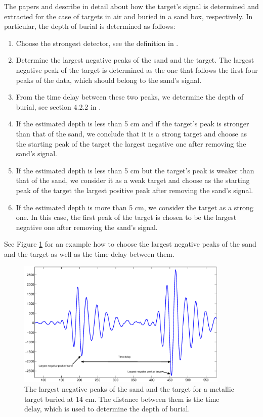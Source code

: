 \documentclass[a4paper,12pt]{article}
\begin{document}
The papers \cite{TBKF:SISC2014} and \cite{TBKF:2013-2} describe in detail about how the target's signal is determined and extracted for the case of targets in air and buried in a sand box, respectively. In particular, the depth of burial is determined as follows:


\begin{enumerate}
   \item Choose the strongest detector, see the definition in \cite{TBKF:2013-2}. 
    \item Determine the largest negative peaks of the sand and the target. The largest negative peak of the target is determined as the one that follows the first four peaks of the data, which should belong to the sand's signal. 
    \item From the time delay between these two peaks, we determine the depth of burial, see section 4.2.2 in \cite{TBKF:2013-2}. 
    \item If the estimated depth is less than 5 cm and if the target's peak is stronger than that of the sand, we conclude that it is a strong target and choose as the starting peak of the target the largest negative one after removing the sand's signal. 
    \item If the estimated depth is less than 5 cm but the target's peak is weaker than that of the sand, we consider it as a weak target and choose as the starting peak of the target the largest positive peak after removing the sand's signal.
    \item If the estimated depth is more than 5 cm, we consider the target as a strong one. In this case, the first peak of the target is chosen to be the largest negative one after removing the sand's signal. 
\end{enumerate}

See Figure \ref{fig:4.30} for an example how to choose the largest negative peaks of the sand and the target as well as the time delay between them. 

\begin{figure}[tph]
\centering
\includegraphics[width =0.9\textwidth]{figure/depth_estimate_1}
\caption{The largest negative peaks of the sand and the target for a metallic target buried at 14 cm. The distance between them is the time delay, which is used to determine the depth of burial. }
\label{fig:4.30}
\end{figure}
\end{document}
